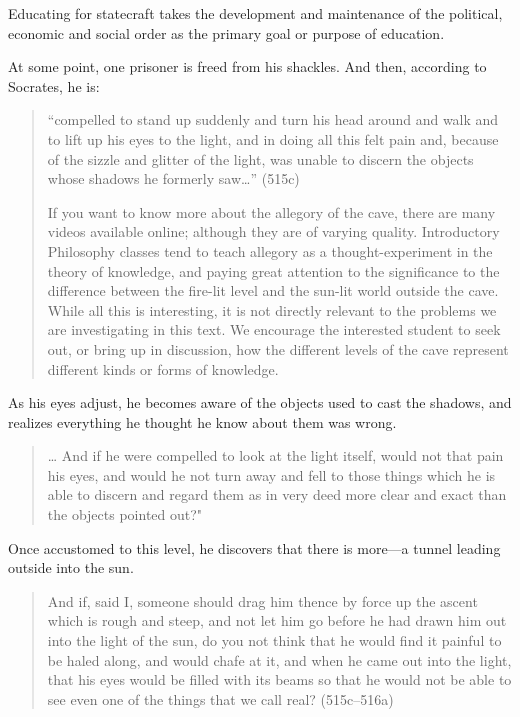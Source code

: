 \begin{purpose}\label{def:forstatecraft}Educating for statecraft takes the development and maintenance of the political, economic and social order as the primary goal or purpose of education.
\end{purpose}

At some point, one prisoner is freed from his shackles. And then, according to Socrates, he is:

\begin{quote}

``compelled to stand up suddenly and turn his head around and walk and to lift up his eyes to the light, and in doing all this felt pain and, because of the sizzle and glitter of the light, was unable to discern the objects whose shadows he formerly saw{\ldots}'' (515c) \begin{question}If you want to know more about the allegory of the cave, there are many videos available online; although they are of varying quality. Introductory Philosophy classes tend to teach allegory as a thought-experiment in the theory of knowledge, and paying great attention to the significance to the difference between the fire-lit level and the sun-lit world outside the cave. While all this is interesting, it is not directly relevant to the problems we are investigating in this text. We encourage the interested student to seek out, or bring up in discussion, how the different levels of the cave represent different kinds or forms of knowledge.\end{question} 
\end{quote}

As his eyes adjust, he becomes aware of the objects used to cast the shadows, and realizes everything he thought he know about them was wrong.

\begin{quote}

{\ldots} And if he were compelled to look at the light itself, would not that pain his eyes, and would he not turn away and fell to those things which he is able to discern and regard them as in very deed more clear and exact than the objects pointed out?"
\end{quote}

Once accustomed to this level, he discovers that there is more---a tunnel leading outside into the sun.

\begin{quote}

And if, said I, someone should drag him thence by force up the ascent which is rough and steep, and not let him go before he had drawn him out into the light of the sun, do you not think that he would find it painful to be haled along, and would chafe at it, and when he came out into the light, that his eyes would be filled with its beams so that he would not be able to see even one of the things that we call real? (515c--516a)
\end{quote}

